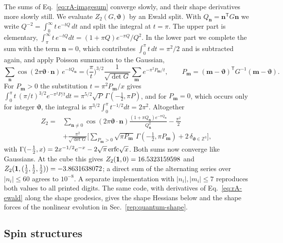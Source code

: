 The sums of Eq.~\eqref{eq:rA-imagesum} converge slowly, and their shape derivatives more slowly still.
We evaluate $Z_2(G,\bm\vartheta)$ by an Ewald split.
With $Q_{\bm n}=\bm n^{\mathsf T}G\bm n$ we write $Q^{-2}=\int_0^\infty t\,e^{-tQ}\,dt$ and split the integral at $t=\pi$.
The upper part is elementary, $\int_\pi^\infty t\,e^{-tQ}dt=(1+\pi Q)e^{-\pi Q}/Q^2$.
In the lower part we complete the sum with the term $\bm n=0$, which contributes $\int_0^\pi t\,dt=\pi^2/2$ and is subtracted again, and apply Poisson summation to the Gaussian,
\begin{equation}
\sum_{\bm n}\cos(2\pi\bm\vartheta\cdot\bm n)\,e^{-tQ_{\bm n}}=\Big(\frac\pi t\Big)^{3/2}\frac{1}{\sqrt{\det G}}\sum_{\bm m}e^{-\pi^2P_{\bm m}/t},\qquad P_{\bm m}=(\bm m-\bm\vartheta)^{\mathsf T}G^{-1}(\bm m-\bm\vartheta).
\end{equation}
For $P_{\bm m}>0$ the substitution $t=\pi^2P_{\bm m}/x$ gives $\int_0^\pi t\,(\pi/t)^{3/2}e^{-\pi^2P/t}dt=\pi^{5/2}\sqrt P\,\Gamma(-\tfrac12,\pi P)$, and for $P_{\bm m}=0$, which occurs only for integer $\bm\vartheta$, the integral is $\pi^{3/2}\int_0^\pi t^{-1/2}dt=2\pi^2$.
Altogether
\begin{equation}
\begin{aligned}
Z_2={}&\sum_{\bm n\neq0}\cos(2\pi\bm\vartheta\cdot\bm n)\frac{(1+\pi Q_{\bm n})e^{-\pi Q_{\bm n}}}{Q_{\bm n}^2}-\frac{\pi^2}{2}\\
&+\frac{\pi^2}{\sqrt{\det G}}\Big[\sum_{P_{\bm m}>0}\sqrt{\pi P_{\bm m}}\,\Gamma(-\tfrac12,\pi P_{\bm m})+2\,\delta_{\bm\vartheta\in\mathbb Z^3}\Big],
\end{aligned}
\label{eq:rA-ewald}
\end{equation}
with $\Gamma(-\tfrac12,x)=2x^{-1/2}e^{-x}-2\sqrt\pi\,{\rm erfc}\sqrt x$.
Both sums now converge like Gaussians.
At the cube this gives $Z_2(\mathbf{1},0)=16.5323159598$ and $Z_2(\mathbf{1},(\tfrac12,\tfrac12,\tfrac12))=-3.8631638072$; a direct sum of the alternating series over $|n_i|\leq60$ agrees to $10^{-8}$. %
A separate implementation with $|n_i|,|m_i|\leq7$ reproduces both values to all printed digits. %
The same code, with derivatives of Eq.~\eqref{eq:rA-ewald} along the shape geodesics, gives the shape Hessians below and the shape forces of the nonlinear evolution in Sec.~\ref{rep:quantum-shape}.

\subsection{Spin structures}
\label{rA:spin}

